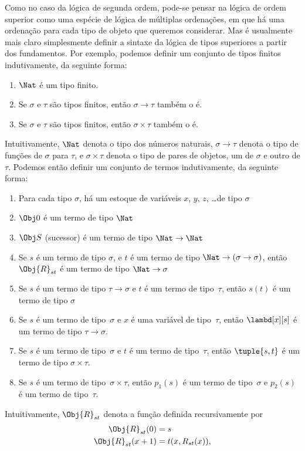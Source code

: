 \documentclass[../../../include/open-logic-section]{subfiles}
\begin{document}
Como no caso da lógica de segunda ordem, pode-se pensar na lógica de
ordem superior como uma espécie de lógica de múltiplas ordenações, em que
há uma ordenação para cada tipo de objeto que queremos considerar. Mas é
usualmente mais
claro simplesmente definir a sintaxe da lógica de tipos superiores a
partir dos fundamentos. Por exemplo, podemos definir um conjunto de tipos
finitos indutivamente, da seguinte forma:
\begin{enumerate}
\item $\Nat$ é um tipo finito.
\item Se $\sigma$ e $\tau$ são tipos finitos, então $\sigma
  \to \tau$ também o é.
\item Se $\sigma$ e $\tau$ são tipos finitos, então $\sigma \times
  \tau$ também o é.
\end{enumerate}
Intuitivamente, $\Nat$ denota o tipo dos números naturais,
$\sigma \to \tau$ denota o tipo de funções de $\sigma$ para
$\tau$, e $\sigma \times \tau$ denota o tipo de pares de objetos,
um de $\sigma$ e outro de $\tau$. Podemos então definir um conjunto de
termos indutivamente, da seguinte forma:
\begin{enumerate}
\item Para cada tipo $\sigma$, há um estoque de variáveis $x$, $y$,
  $z$, \dots de tipo $\sigma$
\item $\Obj 0$ é um termo de tipo $\Nat$
\item $\Obj S$ (sucessor) é um termo de tipo $\Nat \to \Nat$
\item Se $s$ é um termo de tipo $\sigma$, e $t$ é um termo de tipo
  $\Nat \to (\sigma \to \sigma)$, então $\Obj{R}_{st}$ é um termo de tipo
  $\Nat \to \sigma$
\item Se $s$ é um termo de tipo $\tau \to \sigma$ e $t$ é um
  termo de tipo~$\tau$, então $s(t)$ é um termo de tipo $\sigma$
\item Se $s$ é um termo de tipo~$\sigma$ e $x$ é uma variável de
  tipo~$\tau$, então $\lambd[x][s]$ é um termo de tipo $\tau \to \sigma$.
\item Se $s$ é um termo de tipo~$\sigma$ e $t$ é um termo de
  tipo~$\tau$, então $\tuple{s, t}$ é um termo de tipo $\sigma \times
  \tau$.
\item Se $s$ é um termo de tipo~$\sigma \times \tau$, então $p_1(s)$ é um
  termo de tipo~$\sigma$ e $p_2(s)$ é um termo de tipo~$\tau$.
\end{enumerate}
Intuitivamente, $\Obj{R}_{st}$ denota a função definida recursivamente por
\begin{align*}
\Obj{R}_{st}(0) & = s \\
\Obj{R}_{st}(x+1) & = t(x, R_{st}(x)),
\end{align*}
\end{document}
